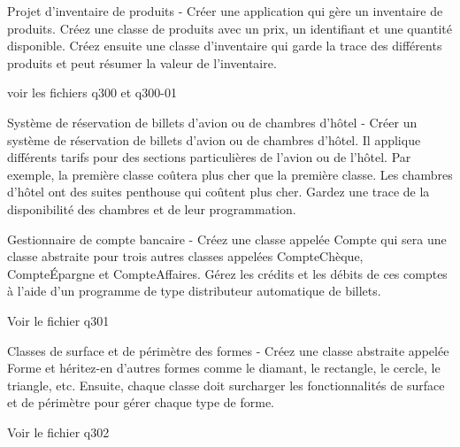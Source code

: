 
        \question
Projet d'inventaire de produits - Créer une application qui gère un inventaire de produits. Créez une classe de produits avec un prix, un identifiant et une quantité disponible. Créez ensuite une classe d'inventaire qui garde la trace des différents produits et peut résumer la valeur de l'inventaire.
        \par
        
        \begin{solution}
        voir les fichiers q300 et q300-01
            
        \end{solution}

\question
Système de réservation de billets d'avion ou de chambres d'hôtel - Créer un système de réservation de billets d'avion ou de chambres d'hôtel. Il applique différents tarifs pour des sections particulières de l'avion ou de l'hôtel. Par exemple, la première classe coûtera plus cher que la première classe. Les chambres d'hôtel ont des suites penthouse qui coûtent plus cher. Gardez une trace de la disponibilité des chambres et de leur programmation.

\question
Gestionnaire de compte bancaire - Créez une classe appelée Compte qui sera une classe abstraite pour trois autres classes appelées CompteChèque, CompteÉpargne et CompteAffaires. Gérez les crédits et les débits de ces comptes à l'aide d'un programme de type distributeur automatique de billets.

       \begin{solution}
       Voir le fichier q301
        \end{solution}
        
\question
Classes de surface et de périmètre des formes - Créez une classe abstraite appelée Forme et héritez-en d'autres formes comme le diamant, le rectangle, le cercle, le triangle, etc. Ensuite, chaque classe doit surcharger les fonctionnalités de surface et de périmètre pour gérer chaque type de forme.

       \begin{solution}
       		Voir le fichier q302
        \end{solution}
       